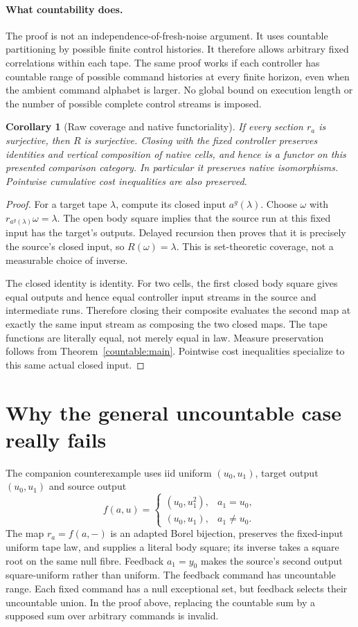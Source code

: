 \documentclass[11pt]{article}
\newtheorem{corollary}[theorem]{Corollary}
\begin{document}
\paragraph{What countability does.} The proof is not an independence-of-fresh-noise argument. It uses countable partitioning by possible finite control histories. It therefore allows arbitrary fixed correlations within each tape. The same proof works if each controller has countable range of possible command histories at every finite horizon, even when the ambient command alphabet is larger. No global bound on execution length or the number of possible complete control streams is imposed.

\begin{corollary}[Raw coverage and native functoriality]\label{countable:functor}
If every section $r_a$ is surjective, then $R$ is surjective. Closing with the fixed controller preserves identities and vertical composition of native cells, and hence is a functor on this presented comparison category. In particular it preserves native isomorphisms. Pointwise cumulative cost inequalities are also preserved.
\end{corollary}
\begin{proof}
For a target tape $\lambda$, compute its closed input $a^g(\lambda)$. Choose $\omega$ with $r_{a^g(\lambda)}\omega=\lambda$. The open body square implies that the source run at this fixed input has the target's outputs. Delayed recursion then proves that it is precisely the source's closed input, so $R(\omega)=\lambda$. This is set-theoretic coverage, not a measurable choice of inverse.

The closed identity is identity. For two cells, the first closed body square gives equal outputs and hence equal controller input streams in the source and intermediate runs. Therefore closing their composite evaluates the second map at exactly the same input stream as composing the two closed maps. The tape functions are literally equal, not merely equal in law. Measure preservation follows from Theorem~\ref{countable:main}. Pointwise cost inequalities specialize to this same actual closed input.
\end{proof}

\section{Why the general uncountable case really fails}
The companion counterexample uses iid uniform $(u_0,u_1)$, target output $(u_0,u_1)$ and source output
\[
 f(a,u)=\begin{cases}(u_0,u_1^2),&a_1=u_0,\\(u_0,u_1),&a_1\ne u_0.\end{cases}
\]
The map $r_a=f(a,-)$ is an adapted Borel bijection, preserves the fixed-input uniform tape law, and supplies a literal body square; its inverse takes a square root on the same null fibre. Feedback $a_1=y_0$ makes the source's second output square-uniform rather than uniform. The feedback command has uncountable range. Each fixed command has a null exceptional set, but feedback selects their uncountable union. In the proof above, replacing the countable sum by a supposed sum over arbitrary commands is invalid.
\end{document}
